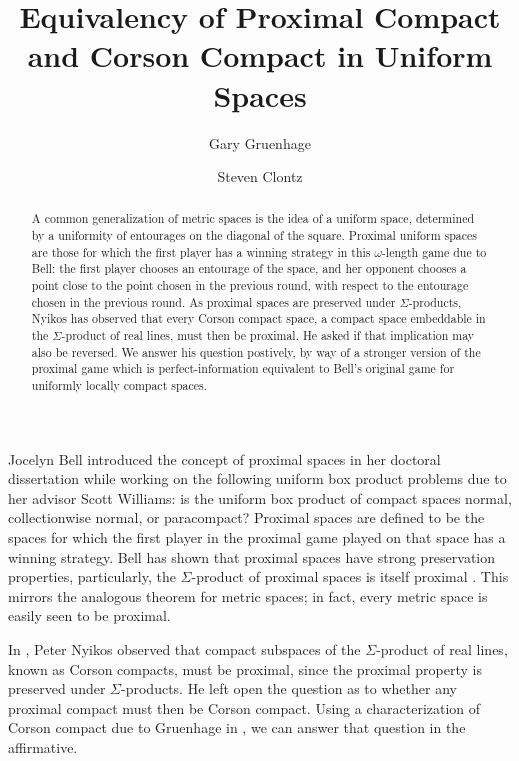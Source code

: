 \documentclass{amsart}
\theoremstyle{definition}
\theoremstyle{remark}
\newcommand{\<}{\langle}
\renewcommand{\>}{\rangle}
\begin{document}
\title{Equivalency of Proximal Compact and Corson Compact in Uniform Spaces}

\author{Gary Gruenhage}
\address{Department of Mathematics, Auburn University, 
Auburn, AL 36830}


\author{Steven Clontz}
\address{Department of Mathematics, Auburn University, 
Auburn, AL 36830}


\begin{abstract}
A common generalization of metric spaces is the idea of a uniform space, determined by a uniformity of entourages on the diagonal of the square. Proximal uniform spaces are those for which the first player has a winning strategy in this $\omega$-length game due to Bell: the first player chooses an entourage of the space, and her opponent chooses a point close to the point chosen in the previous round, with respect to the entourage chosen in the previous round. As proximal spaces are preserved under $\Sigma$-products, Nyikos has observed that every Corson compact space, a compact space embeddable in the $\Sigma$-product of real lines, must then be proximal. He asked if that implication may also be reversed. We answer his question postively, by way of a stronger version of the proximal game which is perfect-information equivalent to Bell's original game for uniformly locally compact spaces.
\end{abstract}


\maketitle



Jocelyn Bell introduced the concept of proximal spaces in her doctoral dissertation while working on the following uniform box product problems due to her advisor Scott Williams: is the uniform box product of compact spaces normal, collectionwise normal, or paracompact? Proximal spaces are defined to be the spaces for which the first player in the proximal game played on that space has a winning strategy. Bell has shown that proximal spaces have strong preservation properties, particularly, the $\Sigma$-product of proximal spaces is itself proximal \cite{b}. This mirrors the analogous theorem for metric spaces; in fact, every metric space is easily seen to be proximal.

In \cite{nproximal}, Peter Nyikos observed that compact subspaces of the $\Sigma$-product of real lines, known as Corson compacts, must be proximal, since the proximal property is preserved under $\Sigma$-products. He left open the question as to whether any proximal compact must then be Corson compact. Using a characterization of Corson compact due to Gruenhage in \cite{gcovering}, we can answer that question in the affirmative.
\end{document}
